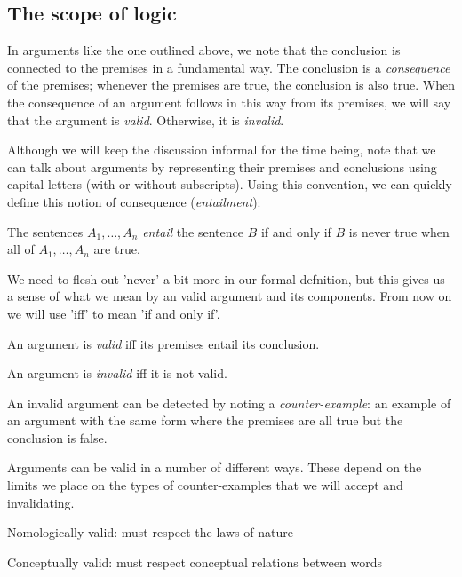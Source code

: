 \subsection{The scope of logic} \cite[][Chapter 2, pp. 7-17]{Mag25}

In arguments like the one outlined above, we note that the conclusion is
connected to the premises in a fundamental way. The conclusion is a
\textit{consequence} of the premises; whenever the premises are true, the
conclusion is also true. When the consequence of an argument follows in this way
from its premises, we will say that the argument is \textit{valid}. Otherwise, it
is \textit{invalid}.

Although we will keep the discussion informal for the time being, note that we can
talk about arguments by representing their premises and conclusions using capital
letters (with or without subscripts). Using this convention, we can quickly define
this notion of consequence (\textit{entailment}):

\begin{argument}
\item[] The sentences $A_1, \dots, A_n$ \textit{entail} the sentence $B$ if and
  only if $B$ is never true when all of $A_1, \dots, A_n$ are true.
\end{argument}

We need to flesh out 'never' a bit more in our formal defnition, but this gives us
a sense of what we mean by an valid argument and its components. From now on we
will use 'iff' to mean 'if and only if'.

\begin{argument}
\item[] An argument is \textit{valid} iff its premises entail its conclusion.
\item[] An argument is \textit{invalid} iff it is not valid.
\end{argument}

An invalid argument can be detected by noting a \textit{counter-example}: an
example of an argument with the same form where the premises are all true but the
conclusion is false.

Arguments can be valid in a number of different ways. These depend on the limits we
place on the types of counter-examples that we will accept and invalidating.

\begin{argument}
\item[] Nomologically valid: must respect the laws of nature
\item[] Conceptually valid: must respect conceptual relations between words
\end{argument}

